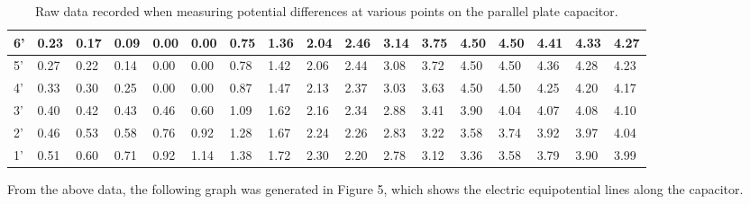 \documentclass[letterpaper]{article}
\begin{document}
\begin{table}[H]
{\begin{tabular}{l|l|l|l|l|l|l|l|l|l|l|l|l|l|l|l|l|}
6' & 0.23 & 0.17 & 0.09 & 0.00 & 0.00 & 0.75 & 1.36 & 2.04 & 2.46 & 3.14 & 3.75 & 4.50 & 4.50 & 4.41 & 4.33 & 4.27 \\ \hline
5' & 0.27 & 0.22 & 0.14 & 0.00 & 0.00 & 0.78 & 1.42 & 2.06 & 2.44 & 3.08 & 3.72 & 4.50 & 4.50 & 4.36 & 4.28 & 4.23 \\ \hline
4' & 0.33 & 0.30 & 0.25 & 0.00 & 0.00 & 0.87 & 1.47 & 2.13 & 2.37 & 3.03 & 3.63 & 4.50 & 4.50 & 4.25 & 4.20 & 4.17 \\ \hline
3' & 0.40 & 0.42 & 0.43 & 0.46 & 0.60 & 1.09 & 1.62 & 2.16 & 2.34 & 2.88 & 3.41 & 3.90 & 4.04 & 4.07 & 4.08 & 4.10 \\ \hline
2' & 0.46 & 0.53 & 0.58 & 0.76 & 0.92 & 1.28 & 1.67 & 2.24 & 2.26 & 2.83 & 3.22 & 3.58 & 3.74 & 3.92 & 3.97 & 4.04 \\ \hline
1' & 0.51 & 0.60 & 0.71 & 0.92 & 1.14 & 1.38 & 1.72 & 2.30 & 2.20 & 2.78 & 3.12 & 3.36 & 3.58 & 3.79 & 3.90 & 3.99 \\ \hline
\end{tabular}%
}
\caption{Raw data recorded when measuring potential differences at various points on the parallel plate capacitor.}
\end{table}
\newpage
From the above data, the following graph was generated in Figure 5, which shows the electric
equipotential lines along the capacitor.
\end{document}
